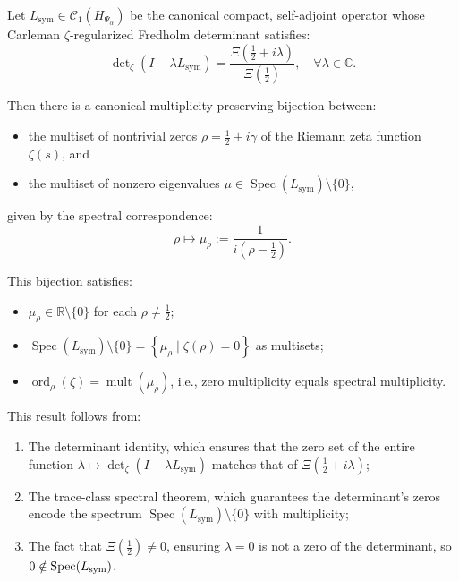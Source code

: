 \begin{theorem}
\label{thm:spectral_zero_bijection_revised}
Let \( L_{\mathrm{sym}} \in \mathcal{C}_1(H_{\Psi_\alpha}) \) be the canonical compact, self-adjoint operator whose Carleman \(\zeta\)-regularized Fredholm determinant satisfies:
\[
\det\nolimits_\zeta(I - \lambda L_{\mathrm{sym}})
= \frac{\Xi\left(\tfrac{1}{2} + i\lambda\right)}{\Xi\left(\tfrac{1}{2}\right)},
\quad \forall \lambda \in \mathbb{C}.
\]

Then there is a canonical multiplicity-preserving bijection between:
\begin{itemize}
  \item the multiset of nontrivial zeros \( \rho = \tfrac{1}{2} + i\gamma \) of the Riemann zeta function \( \zeta(s) \), and
  \item the multiset of nonzero eigenvalues \( \mu \in \operatorname{Spec}(L_{\mathrm{sym}}) \setminus \{0\} \),
\end{itemize}
given by the spectral correspondence:
\[
\rho \mapsto \mu_\rho := \frac{1}{i(\rho - \tfrac{1}{2})}.
\]

\medskip

\noindent
This bijection satisfies:
\begin{itemize}
  \item \( \mu_\rho \in \mathbb{R} \setminus \{0\} \) for each \( \rho \ne \tfrac{1}{2} \);
  \item \( \operatorname{Spec}(L_{\mathrm{sym}}) \setminus \{0\}
  = \left\{ \mu_\rho \mid \zeta(\rho) = 0 \right\} \) as multisets;
  \item \( \operatorname{ord}_\rho(\zeta) = \operatorname{mult}(\mu_\rho) \), i.e., zero multiplicity equals spectral multiplicity.
\end{itemize}

\medskip
\noindent
This result follows from:
\begin{enumerate}
  \item The determinant identity, which ensures that the zero set of the entire function \( \lambda \mapsto \det_\zeta(I - \lambda L_{\mathrm{sym}}) \) matches that of \( \Xi(\tfrac{1}{2} + i\lambda) \);
  \item The trace-class spectral theorem, which guarantees the determinant’s zeros encode the spectrum \( \operatorname{Spec}(L_{\mathrm{sym}}) \setminus \{0\} \) with multiplicity;
  \item The fact that \( \Xi(\tfrac{1}{2}) \ne 0 \), ensuring \( \lambda = 0 \) is not a zero of the determinant, so \( 0 \notin \operatorname{Spec}(L_{\mathrm{sym}}) \).
\end{enumerate}
\end{theorem}
